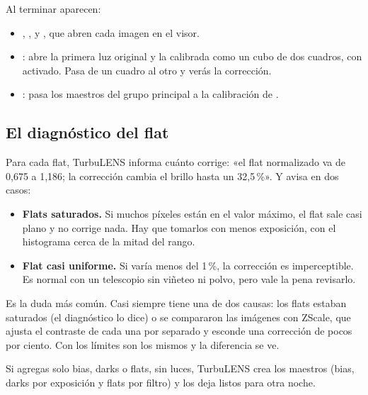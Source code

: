 
Al terminar aparecen:
\begin{itemize}
\item {}, ,  y ,
que abren cada imagen en el visor.
\item {}: abre la primera luz original y la calibrada como un cubo de dos cuadros, con
 activado. Pasa de un cuadro al otro y verás la corrección.
\item {}: pasa los maestros del grupo principal a la calibración de .
\end{itemize}

\subsection{El diagnóstico del flat}

Para cada flat, TurbuLENS informa cuánto corrige: «el flat normalizado va de 0,675 a 1,186; la corrección cambia el
brillo hasta un 32,5\,\%». Y avisa en dos casos:
\begin{itemize}
\item \textbf{Flats saturados.} Si muchos píxeles están en el valor máximo, el flat sale casi plano y no corrige nada.
Hay que tomarlos con menos exposición, con el histograma cerca de la mitad del rango.
\item \textbf{Flat casi uniforme.} Si varía menos del 1\,\%, la corrección es imperceptible. Es normal con un
telescopio sin viñeteo ni polvo, pero vale la pena revisarlo.
\end{itemize}

\begin{nota}
Es la duda más común. Casi siempre tiene una de dos causas: los flats estaban saturados (el diagnóstico lo dice) o se
compararon las imágenes con ZScale, que ajusta el contraste de cada una por separado y esconde una corrección de pocos
por ciento. Con  los límites son los mismos y la diferencia se ve.
\end{nota}

\begin{consejo}
Si agregas solo bias, darks o flats, sin luces, TurbuLENS crea los maestros (bias, darks por exposición y flats por
filtro) y los deja listos para otra noche.
\end{consejo}
